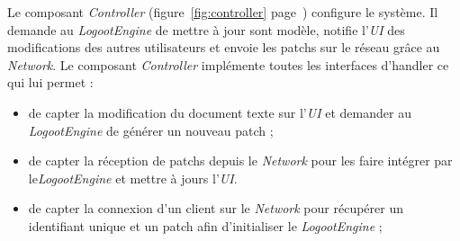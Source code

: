   Le composant \emph{Controller} (figure~\ref{fig:controller}
  page~\pageref{fig:controller}) configure le système. Il demande
  au \emph{LogootEngine} de mettre à jour sont modèle, notifie l'\emph{UI} des
  modifications des autres utilisateurs et envoie les patchs sur le réseau
  grâce au \emph{Network}. Le composant \emph{Controller}
  implémente toutes les interfaces d'handler ce qui lui permet :
  \begin{itemize}
    \item de capter la modification du document texte sur l'\emph{UI} et
    demander au \emph{LogootEngine} de générer un nouveau patch ;
    \item de capter la réception de patchs depuis le \emph{Network} pour les
    faire intégrer par le\emph{LogootEngine} et mettre à jours l'\emph{UI}.
    \item de capter la connexion d'un client sur le \emph{Network} pour récupérer
    un identifiant unique et un patch afin d'initialiser le \emph{LogootEngine} ;
  \end{itemize}

